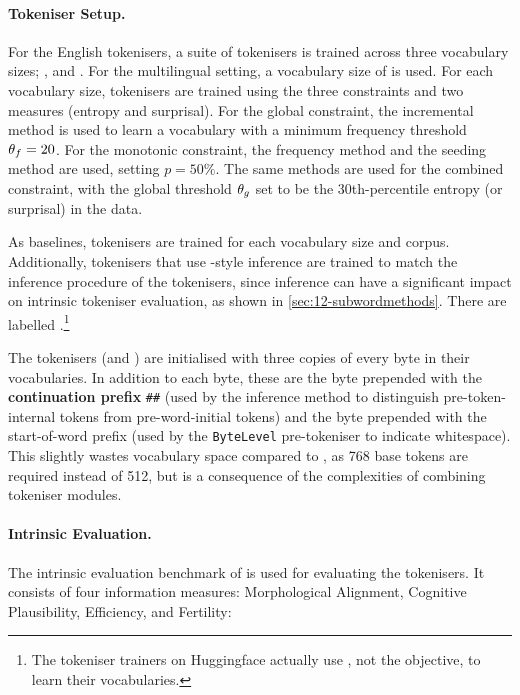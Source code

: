 \paragraph{Tokeniser Setup.} 
For the English tokenisers, a suite of tokenisers is trained across three vocabulary sizes; ,  and . For the multilingual setting, a vocabulary size of  is used. For each vocabulary size, tokenisers are trained using the three constraints and two measures (entropy and surprisal). For the global constraint, the incremental method is used to learn a vocabulary with a minimum frequency threshold $\theta_f = 20$. For the monotonic constraint, the frequency method and the seeding method are used, setting $p=50\%$. The same methods are used for the combined constraint, with the global threshold $\theta_g$ set to be the 30th-percentile entropy (or surprisal) in the data.

As baselines, \bpe tokenisers are trained for each vocabulary size and corpus. Additionally, \bpe tokenisers that use \wordpiecefull-style inference are trained to match the inference procedure of the \bytespan tokenisers, since inference can have a significant impact on intrinsic tokeniser evaluation, as shown in \cref{sec:12-subwordmethods}. There are labelled \bpewp.\footnote{The \wordpiecefull tokeniser trainers on Huggingface actually use \bpe, not the \wordpiecefull objective, to learn their vocabularies.}

The \bytespan tokenisers (and \bpewp) are initialised with three copies of every byte in their vocabularies. In addition to each byte, these are the byte prepended with the \wordpiecefull \textbf{continuation prefix} \texttt{\#\#} (used by the inference method to distinguish pre-token-internal tokens from pre-word-initial tokens) and the byte prepended with the start-of-word prefix (used by the \texttt{ByteLevel} pre-tokeniser to indicate whitespace). This slightly wastes vocabulary space compared to \bpe, as 768 base tokens are required instead of 512, but is a consequence of the complexities of combining tokeniser modules.

\paragraph{Intrinsic Evaluation.} 

The intrinsic evaluation benchmark of \citet{uzan-etal-2024-greed} is used for evaluating the tokenisers. It consists of four information measures: Morphological Alignment, Cognitive Plausibility, \renyi Efficiency, and Fertility:

